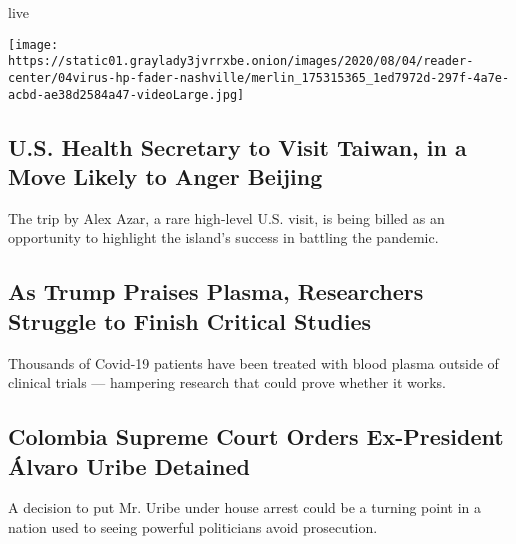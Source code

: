 live

\texttt{[image: https://static01.graylady3jvrrxbe.onion/images/2020/08/04/reader-center/04virus-hp-fader-nashville/merlin\_175315365\_1ed7972d-297f-4a7e-acbd-ae38d2584a47-videoLarge.jpg]}

\href{/2020/08/04/world/asia/taiwan-azar-beijing-coronavirus.html}{}

\hypertarget{us-health-secretary-to-visit-taiwan-in-a-move-likely-to-anger-beijing}{%
\subsection{U.S. Health Secretary to Visit Taiwan, in a Move Likely to
Anger
Beijing}\label{us-health-secretary-to-visit-taiwan-in-a-move-likely-to-anger-beijing}}

The trip by Alex Azar, a rare high-level U.S. visit, is being billed as
an opportunity to highlight the island's success in battling the
pandemic.

\href{/2020/08/04/health/trump-plasma.html}{}

\hypertarget{as-trump-praises-plasma-researchers-struggle-to-finish-critical-studies}{%
\subsection{As Trump Praises Plasma, Researchers Struggle to Finish
Critical
Studies}\label{as-trump-praises-plasma-researchers-struggle-to-finish-critical-studies}}

Thousands of Covid-19 patients have been treated with blood plasma
outside of clinical trials --- hampering research that could prove
whether it works.

\href{/2020/08/04/world/americas/colombia-president-uribe-charged.html}{}

\hypertarget{colombia-supreme-court-orders-ex-president-uxe1lvaro-uribe-detained}{%
\subsection{Colombia Supreme Court Orders Ex-President Álvaro Uribe
Detained}\label{colombia-supreme-court-orders-ex-president-uxe1lvaro-uribe-detained}}

\href{/2020/08/04/world/americas/colombia-president-uribe-charged.html}{}

A decision to put Mr. Uribe under house arrest could be a turning point
in a nation used to seeing powerful politicians avoid prosecution.

